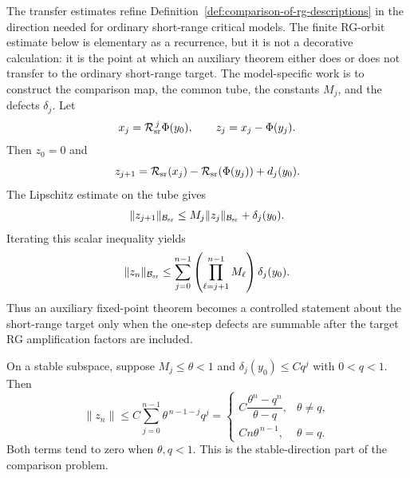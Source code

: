 The transfer estimates refine
Definition~\ref{def:comparison-of-rg-descriptions} in the direction needed
for ordinary short-range critical models.  The finite RG-orbit estimate below
is elementary as a recurrence, but it is not a decorative calculation: it is
the point at which an auxiliary theorem either does or does not transfer to
the ordinary short-range target.  The model-specific work is to construct the
comparison map, the common tube, the constants \(M_j\), and the defects
\(\delta_j\).  Let
\[
  x_j=\mathcal R_{\rm sr}^{\,j}\Phi(y_0),
  \qquad
  z_j=x_j-\Phi(y_j).
\]
Then \(z_0=0\) and
\begin{equation}
  z_{j+1}
  =
  \mathcal R_{\rm sr}(x_j)
  -
  \mathcal R_{\rm sr}(\Phi(y_j))
  +
  d_j(y_0).
  \label{eq:auxiliary-short-range-z-recursion}
\end{equation}
The Lipschitz estimate on the tube gives
\begin{equation}
  \|z_{j+1}\|_{\mathcal B_{\rm sr}}
  \leq
  M_j\|z_j\|_{\mathcal B_{\rm sr}}+\delta_j(y_0).
  \label{eq:auxiliary-short-range-z-bound-step}
\end{equation}
Iterating this scalar inequality yields
\begin{equation}
  \|z_n\|_{\mathcal B_{\rm sr}}
  \leq
  \sum_{j=0}^{n-1}
  \left(\prod_{\ell=j+1}^{n-1}M_\ell\right)\delta_j(y_0).
  \label{eq:auxiliary-short-range-telescoping-bound}
\end{equation}
Thus an auxiliary fixed-point theorem becomes a controlled statement about
the short-range target only when the one-step defects are summable after the
target RG amplification factors are included.

On a stable subspace, suppose \(M_j\leq\theta<1\) and
\(\delta_j(y_0)\leq Cq^j\) with \(0<q<1\).  Then
\begin{equation}
  \|z_n\|
  \leq
  C\sum_{j=0}^{n-1}\theta^{\,n-1-j}q^j
  =
  \begin{cases}
    C\dfrac{\theta^n-q^n}{\theta-q}, & \theta\neq q,\\[1.2em]
    Cn\theta^{\,n-1}, & \theta=q .
  \end{cases}
  \label{eq:auxiliary-short-range-stable-geometric-bound}
\end{equation}
Both terms tend to zero when \(\theta,q<1\).  This is the stable-direction
part of the comparison problem.

